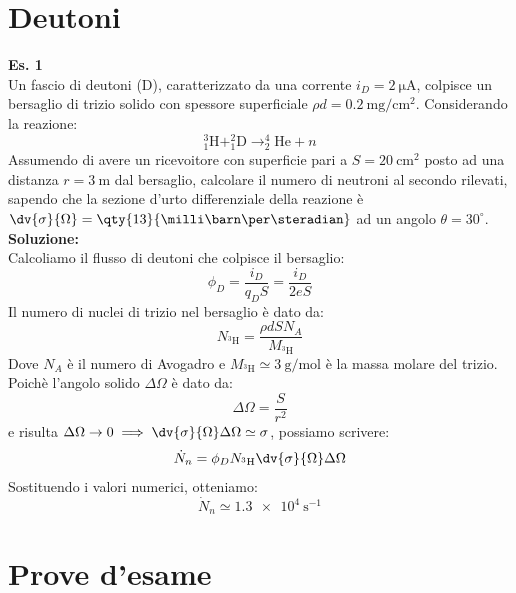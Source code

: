 \section{Deutoni}
\textbf{Es. 1}\\
Un fascio di deutoni (D), caratterizzato da una corrente $i_D = \qty{2}{\micro\ampere}$, colpisce un bersaglio di trizio solido con spessore superficiale $\rho d = \qty{0.2}{\milli\gram\per\centi\meter^2}$. Considerando la reazione:
\begin{equation}
 ^3_1\text{H} + ^2_1\text{D} \rightarrow ^4_2\text{He} + n
\end{equation}
Assumendo di avere un ricevoitore con superficie pari a $S=\qty{20}{\centi\meter^2}$ posto ad una distanza $r=\qty{3}{\meter}$ dal bersaglio, calcolare il numero di neutroni al secondo rilevati, sapendo che la sezione d'urto differenziale della reazione è $\dv{\sigma}{\Omega} = \qty{13}{\milli\barn\per\steradian}$ ad un angolo $\theta = 30^\circ$.\\
\textbf{Soluzione:}\\
Calcoliamo il flusso di deutoni che colpisce il bersaglio:
\begin{equation}
 \phi_D = \dfrac{i_D}{q_D S} = \dfrac{i_D}{2e S}
\end{equation}
Il numero di nuclei di trizio nel bersaglio è dato da:
\begin{equation}
 N_{^3\text{H}} = \dfrac{\rho d S N_A}{M_{^3\text{H}}}
\end{equation}
Dove $N_A$ è il numero di Avogadro e $M_{^3\text{H}} \simeq \qty{3}{\gram\per\mole}$ è la massa molare del trizio.\\
Poichè l'angolo solido $\Delta \Omega$ è dato da:
\begin{equation}
 \Delta \Omega = \dfrac{S}{r^2}
\end{equation}
e risulta $\Delta \Omega \rightarrow 0 \implies \dv{\sigma}{\Omega} \Delta \Omega \simeq \sigma$, possiamo scrivere:
\begin{equation}
  \dot{N}_n = \phi_D N_{^3\text{H}} \dv{\sigma}{\Omega} \Delta \Omega
\end{equation}
Sostituendo i valori numerici, otteniamo:
\begin{equation}
 \dot{N}_n \simeq \qty{1.3e4}{\second^{-1}}
\end{equation}

\section{Prove d'esame}
